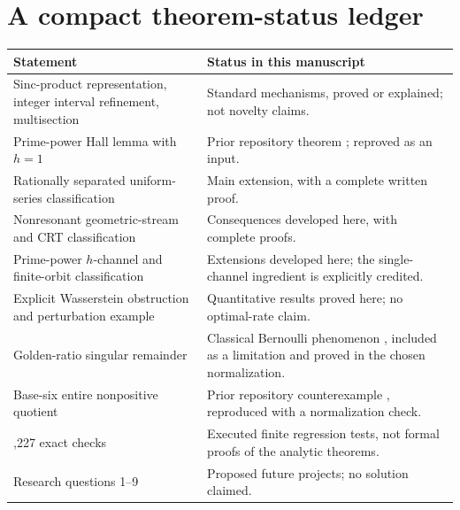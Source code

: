 \documentclass[11pt,letterpaper]{article}
\theoremstyle{definition}
\theoremstyle{remark}
\numberwithin{equation}{section}
\begin{document}
\section{A compact theorem-status ledger}\label{app:status}
\begin{center}
\begin{tabularx}{\textwidth}{@{}>{\raggedright\arraybackslash}p{}>{\raggedright\arraybackslash}X@{}}
\toprule
Statement & Status in this manuscript\\
\midrule
Sinc-product representation, integer interval refinement, multisection & Standard mechanisms, proved or explained; not novelty claims.\\
Prime-power Hall lemma with $h=1$ & Prior repository theorem \cite{repo-hall}; reproved as an input.\\
Rationally separated uniform-series classification & Main extension, with a complete written proof.\\
Nonresonant geometric-stream and CRT classification & Consequences developed here, with complete proofs.\\
Prime-power $h$-channel and finite-orbit classification & Extensions developed here; the single-channel ingredient is explicitly credited.\\
Explicit Wasserstein obstruction and perturbation example & Quantitative results proved here; no optimal-rate claim.\\
Golden-ratio singular remainder & Classical Bernoulli phenomenon \cite{erdos}, included as a limitation and proved in the chosen normalization.\\
Base-six entire nonpositive quotient & Prior repository counterexample \cite{repo-hall}, reproduced with a normalization check.\\
156,227 exact checks & Executed finite regression tests, not formal proofs of the analytic theorems.\\
Research questions 1--9 & Proposed future projects; no solution claimed.\\
\bottomrule
\end{tabularx}
\end{center}
\end{document}
